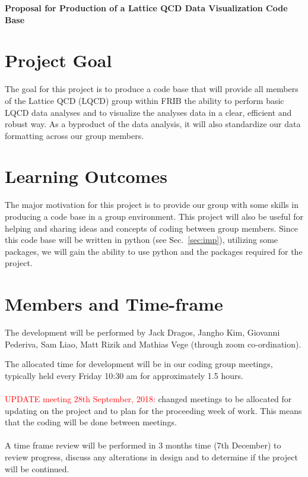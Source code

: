 \documentclass[letterpaper,11pt]{article}
\begin{document}
{\centering \bf \LARGE Proposal for Production of a Lattice QCD Data Visualization Code Base}

\section{Project Goal}
The goal for this project is to produce a code base that will provide all members of the
Lattice QCD (LQCD) group within FRIB the ability to perform basic LQCD data analyses and to visualize the analyses data
in a clear, efficient and robust way. As a byproduct of the data analysis,
it will also standardize our data formatting across our group members.

\section{Learning Outcomes}
The major motivation for this project is to provide our group with some skills in producing a code base in a group environment.
This project will also be useful for helping and sharing ideas and concepts of coding between group members.
Since this code base will be written in python (see Sec.~\ref{sec:imp}), utilizing some packages, we will gain the ability to
use python and the packages required for the project.

\section{Members and Time-frame}
The development will be performed by Jack Dragos, Jangho Kim, Giovanni Pederiva, Sam Liao, Matt Rizik and Mathias Vege (through zoom co-ordination).

The allocated time for development will be in our coding group meetings, typically held every Friday 10:30 am for approximately 1.5 hours.
\\ \hline \\
\vspace*{0.5cm}
\textcolor{red}{UPDATE meeting 28th September, 2018:} changed meetings to be allocated for updating on the project and to plan for the proceeding week of work.
This means that the coding will be done between meetings.
\\ \hline \\
\vspace*{0.5cm}
A time frame review will be performed in 3 months time (7th December) to review progress, discuss any alterations in design and to determine
if the project will be continued.
\end{document}
